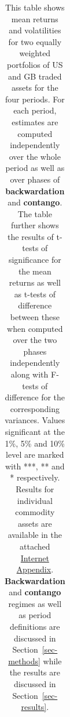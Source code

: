 \documentclass[
  authoryear,
  preprint,
  3p]{elsarticle}
\begin{document}
\begin{longtable}[t]{>{}l>{}l>{}l>{}r>{}r>{}r>{}r}

\caption{\label{tbl-stats-regime-tests}This table shows mean returns and
volatilities for two equally weighted portfolios of US and GB traded
assets for the four periods. For each period, estimates are computed
independently over the whole period as well as over phases of
\textbf{backwardation} and \textbf{contango}. The table further shows
the results of t-tests of significance for the mean returns as well as
t-tests of difference between these when computed over the two phases
independently along with F-tests of difference for the corresponding
variances. Values significant at the 1\%, 5\% and 10\% level are marked
with ***, ** and * respectively. Results for individual commodity assets
are available in the attached
\href{https://bautheac.shinyapps.io/co-movement/}{Internet Appendix}.
\textbf{Backwardation} and \textbf{contango} regimes as well as period
definitions are discussed in Section~\ref{sec-methods} while the results
are discussed in Section~\ref{sec-results}.}

\tabularnewline


\end{longtable}
\end{document}
